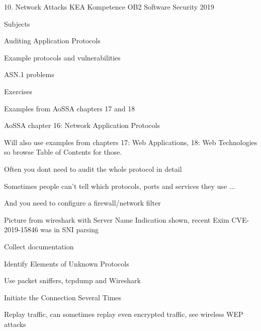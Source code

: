 \documentclass[Screen16to9,17pt]{foils}
\begin{document}
\mytitlepage
{10. Network Attacks}
{KEA Kompetence OB2 Software Security 2019}


\begin{list1}
\item Subjects
\begin{list2}
\item Auditing Application Protocols
\item Example protocols and vulnerabilities
\item ASN.1 problems
\end{list2}
\item Exercises
\begin{list2}
\item Examples from AoSSA chapters 17 and 18
\end{list2}
\end{list1}


\begin{list1}
\item AoSSA chapter 16: Network Application Protocols
\item Will also use examples from chapters 17: Web Applications, 18: Web Technologies so browse Table of Contents for those.
\end{list1}



\begin{list1}
\item Often you dont need to audit the whole protocol in detail
\item Sometimes people can't tell which protocols, ports and services they use ...
\item And you need to configure a firewall/network filter
\item Picture from wireshark with Server Name Indication shown, recent Exim CVE-2019-15846 was in SNI parsing
\end{list1}


\begin{list2}
\item Collect documentation
\item Identify Elements of Unknown Protocols
\item Use packet sniffers, tcpdump and Wireshark
\item Initiate the Connection Several Times
\item Replay traffic, can sometimes replay even encrypted traffic, see wireless WEP attacks
\end{list2}
\end{document}
